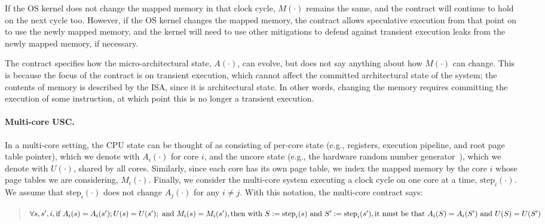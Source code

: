 If the OS kernel does not change the mapped memory in that clock cycle,
$M(\cdot)$ remains the same, and the contract will continue to hold on
the next cycle too.  However, if the OS kernel changes the mapped memory,
the contract allows speculative execution from that point on to use the
newly mapped memory, and the kernel will need to use other mitigations
to defend against transient execution leaks from the newly mapped memory,
if necessary.

The contract specifies how the micro-architectural state, $A(\cdot)$,
can evolve, but does not say anything about how $M(\cdot)$ can change.
This is because the focus of the contract is on transient execution,
which cannot affect the committed architectural state of the system; the
contents of memory is described by the ISA, since it is architectural
state.  In other words, changing the memory requires committing the
execution of some instruction, at which point this is no longer a
transient execution.

\paragraph{Multi-core USC.} In a multi-core setting, the CPU state can be thought of as consisting
of per-core state (e.g., registers, execution pipeline, and root
page table pointer), which we denote with $A_i(\cdot)$ for core $i$,
and the uncore state (e.g., the hardware random number
generator~\cite{ragab:crosstalk}), which we denote with $U(\cdot)$,
shared by all cores.  Similarly, since each core has its own page table,
we index the mapped memory by the core $i$ whose page tables we are
considering, $M_i(\cdot)$.  Finally, we consider the multi-core system
executing a clock cycle on one core at a time, $\textrm{step}_i(\cdot)$.
We assume that $\textrm{step}_i(\cdot)$ does not change $A_j(\cdot)$ for
any $i\neq j$.
With this notation, the multi-core contract says:

\begin{small}
\begin{quote}
$\forall s, s', i, \\
  \textrm{if~} A_i(s) = A_i(s');
               U(s) = U(s');
  \textrm{~and~} M_i(s) = M_i(s'), \\
  \textrm{then~with~} S := \textrm{step}_i(s)
  \textrm{~and~} S' := \textrm{step}_i(s'), \\
  \textrm{it~must~be~that~} A_i(S) = A_i(S')
  \textrm{~and~} U(S) = U(S')$
\end{quote}
\end{small}

